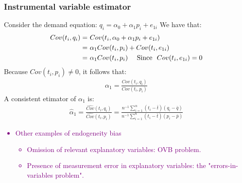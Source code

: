 \documentclass[a4paper,twoside,11pt]{article}
\begin{document}
\subsubsection{Instrumental variable estimator}
Consider the demand equation: $q_i = \alpha_0 + \alpha_1 p_i + e_{1i}$
\newline
We have that:
\begin{equation*}
\begin{aligned}
Cov(t_i, q_i) =& \ Cov(t_i, \alpha_0 + \alpha_1 p_i + e_{1i}) \\
=& \ \alpha_1 Cov(t_i,p_i) + Cov(t_i, e_{1i}) \\
=& \ \alpha_1 Cov(t_i , p_i) \ \ \ \ \textmd{Since} \ \ Cov(t_i, e_{1i}) = 0
\end{aligned} 
\end{equation*}
Because $Cov(t_i, p_i) \ne 0$, it follows that:
\begin{equation*}
\begin{aligned}
\alpha_1 = \frac{Cov(t_i,q_i)}{Cov(t_i,p_i)}
\end{aligned} 
\end{equation*}
A consistent etimator of $\alpha_1$ is: 
\begin{equation*}
\begin{aligned}
\hat{\alpha}_1 = \frac{\widehat{Cov}(t_i,q_i)}{\widehat{Cov}(t_i,p_i)} = \frac{n^{-1}\sum^n_{i=1}(t_i - \bar t)(q_i - \bar q)}{n^{-1} \sum^n_{i=1} (t_i - \bar t)(p_i - \bar p)}
\end{aligned} 
\end{equation*}
\textcolor{Purple}{
\begin{itemize}
    \item Other examples of endogeneity bias
    \begin{itemize}
        \item Omission of relevant explanatory variables: OVB problem.
        \item Presence of measurement error in explanatory variables: the "errors-in-variables problem".
    \end{itemize}
\end{itemize}
}
\end{document}
